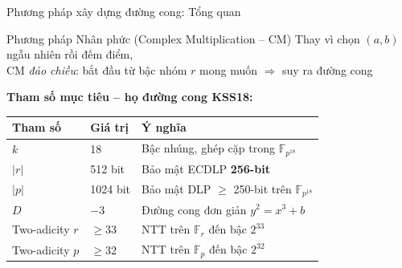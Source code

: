 \begin{frame}{Phương pháp xây dựng đường cong: Tổng quan}
  \begin{block}{Phương pháp Nhân phức (Complex Multiplication -- CM)}
    Thay vì chọn $(a,b)$ ngẫu nhiên rồi đếm điểm,\\
    CM \emph{đảo chiều}: bắt đầu từ bậc nhóm $r$ mong muốn $\Rightarrow$ suy ra đường cong
  \end{block}
  \vspace{0.4em}
  \textbf{Tham số mục tiêu -- họ đường cong KSS18:}
  \begin{table}
    \small
    \begin{tabular}{llp{5.5cm}}
      \toprule
      Tham số & Giá trị & Ý nghĩa \\
      \midrule
      $k$ & 18 & Bậc nhúng, ghép cặp trong $\mathbb{F}_{p^{18}}$ \\
      $|r|$ & 512 bit & Bảo mật ECDLP \textbf{256-bit} \\
      $|p|$ & 1024 bit & Bảo mật DLP $\geq$ 250-bit trên $\mathbb{F}_{p^{18}}$ \\
      $D$ & $-3$ & Đường cong đơn giản $y^2 = x^3 + b$ \\
      Two-adicity $r$ & $\geq 33$ & NTT trên $\mathbb{F}_r$ đến bậc $2^{33}$ \\
      Two-adicity $p$ & $\geq 32$ & NTT trên $\mathbb{F}_p$ đến bậc $2^{32}$ \\
      \bottomrule
    \end{tabular}
  \end{table}
\end{frame}
